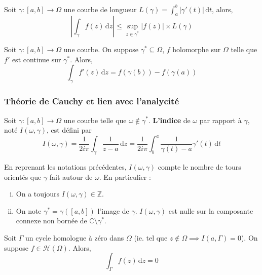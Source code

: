 	\begin{proposition}
		Soit $\gamma : [a,b] \rightarrow \Omega$ une courbe de longueur $L(\gamma) = \int_{a}^{b} \vert \gamma'(t) \vert \, \mathrm{d}t$, alors,
		\[ \left\vert \int_\gamma f(z) \, \mathrm{d}z \right\vert \leq \sup_{z \in \gamma^*} \vert f(z) \vert \times L(\gamma) \]
	\end{proposition}

	\begin{proposition}
		Soit $\gamma : [a,b] \rightarrow \Omega$ une courbe. On suppose $\gamma^* \subseteq \Omega$, $f$ holomorphe sur $\Omega$ telle que $f'$ est continue sur $\gamma^*$. Alors,
		\[ \int_\gamma f'(z) \, \mathrm{d}z = f(\gamma(b)) - f(\gamma(a)) \]
	\end{proposition}

	\subsubsection{Théorie de Cauchy et lien avec l'analycité}

	\begin{definition}
		Soit $\gamma : [a,b] \rightarrow \Omega$ une courbe telle que $\omega \notin \gamma^*$. \textbf{L'indice} de $\omega$ par rapport à $\gamma$, noté $I(\omega, \gamma)$, est défini par
		\[ I(\omega, \gamma) = \frac{1}{2i\pi} \int_\gamma \frac{1}{z-a} \, \mathrm{d}z = \frac{1}{2i\pi} \int_b^a \frac{1}{\gamma(t)-a} \gamma'(t) \, \mathrm{d}t \]
	\end{definition}

	\begin{remark}
		En reprenant les notations précédentes, $I(\omega, \gamma)$ compte le nombre de tours orientés que $\gamma$ fait autour de $\omega$. En particulier :
		\begin{enumerate}[(i)]
			\item On a toujours $I(\omega, \gamma) \in \mathbb{Z}$.
			\item On note $\gamma^* = \gamma([a,b])$ l'image de $\gamma$. $I(\omega, \gamma)$ est nulle sur la composante connexe non bornée de $\mathbb{C} \setminus \gamma^*$.
		\end{enumerate}
	\end{remark}


	\begin{theorem}
		Soit $\Gamma$ un cycle homologue à zéro dans $\Omega$ (ie. tel que $z \notin \Omega \implies I(a, \Gamma) = 0$). On suppose $f \in \mathcal{H}(\Omega)$. Alors,
		\[ \int_\Gamma f(z) \, \mathrm{d}z = 0 \]
	\end{theorem}

